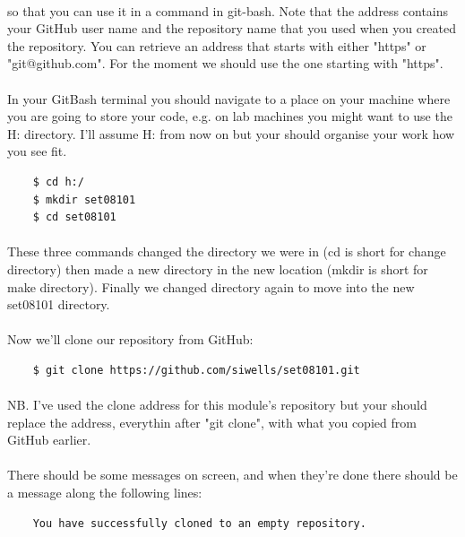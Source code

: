 \documentclass[10pt, a4paper, twosize]{article}
\begin{document}
\paragraph{} so that you can use it in a command in git-bash. Note that the address contains your GitHub user name and the repository name that you used when you created the repository. You can retrieve an address that starts with either "https" or "git@github.com". For the moment we should use the one starting with "https".

\paragraph{} In your GitBash terminal you should navigate to a place on your machine where you are going to store your code, e.g. on lab machines you might want to use the H: directory. I'll assume H: from now on but your should organise your work how you see fit.

\begin{lstlisting}
    $ cd h:/
    $ mkdir set08101
    $ cd set08101
\end{lstlisting}

\paragraph{} These three commands changed the directory we were in (cd is short for change directory) then made a new directory in the new location (mkdir is short for make directory). Finally we changed directory again to move into the new set08101 directory.

\paragraph{} Now we'll clone our repository from GitHub:

\begin{lstlisting}
    $ git clone https://github.com/siwells/set08101.git
\end{lstlisting}

\paragraph{} NB. I've used the clone address for this module's repository but your should replace the address, everythin after "git clone", with what you copied from GitHub earlier.

\paragraph{} There should be some messages on screen, and when they're done there should be a message along the following lines:
\begin{lstlisting}
    You have successfully cloned to an empty repository.
\end{lstlisting}
\end{document}
